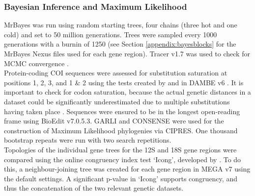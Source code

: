 \subsubsection{Bayesian Inference and Maximum Likelihood}

MrBayes was run using random starting trees, four chains (three hot and one cold) and set to 50 million generations. Trees were sampled every 1000 generations with a burnin of 1250 (see Section \ref{appendix:bayesblocks} for the MrBayes Nexus files used for each gene region). Tracer v1.7 was used to check for MCMC convergence \citep{rambaut2018posterior}. \\ 
Protein-coding COI sequences were assessed for substitution saturation at positions 1, 2, 3, and 1 \& 2 using the tests created by \citet{xia2003index} and \citet{xia2009assessing} in DAMBE v6 \citep{xia2018dambe7}. It is important to check for codon saturation, because the actual genetic distances in a dataset could be significantly underestimated due to multiple substitutions having taken place \citep{philippe2011resolving}. 
Sequences were ensured to be in the longest open-reading frame using BioEdit v7.0.5.3. 
GARLI and CONSENSE were used for the construction of Maximum Likelihood phylogenies via CIPRES. One thousand bootstrap repeats were run with two search repetitions. \\
Topologies of the individual gene trees for the 12S and 18S gene regions were compared using the online congruency index test `Icong', developed by \citet{devienne2007congruence}. To do this, a neighbour-joining tree was created for each gene region in MEGA v7 \citep{mega7} using the default settings. A significant p-value in `Icong' supports congruency, and thus the concatenation of the two relevant genetic datasets. 

